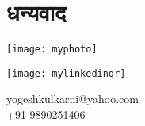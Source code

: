 \chapter*{धन्यवाद }

\begin{minipage}[T]{0.5\textwidth}
    \centering
    \texttt{[image: myphoto]}
\end{minipage}%
\begin{minipage}[T]{0.5\textwidth}
	\centering
    \texttt{[image: mylinkedinqr]}
	
	
	yogeshkulkarni@yahoo.com \\
	+91 9890251406
\end{minipage}
  

